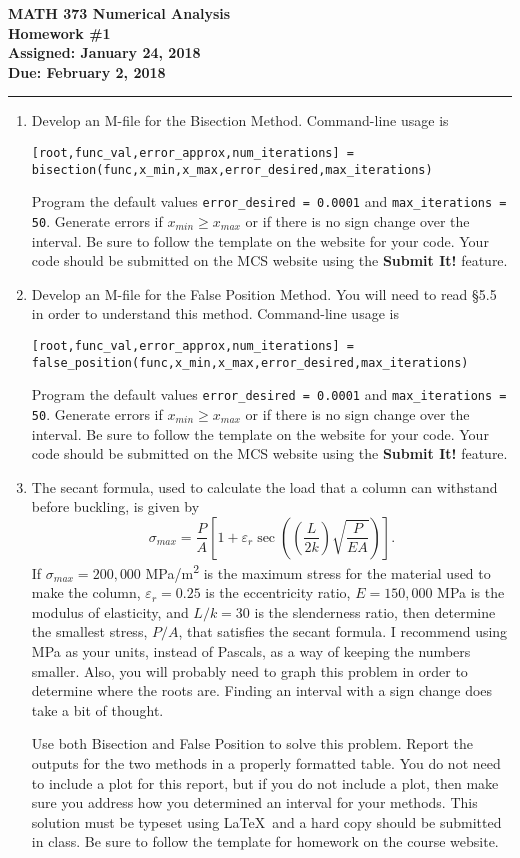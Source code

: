 \documentclass[11pt]{article}
\newcommand{\HWKtitle}[4]{\begin{center}
\textbf{#1\\Homework #2\\Assigned: #3\\Due: #4}
\end{center}\medskip\hrule\bigskip}
\begin{document}
\HWKtitle{MATH 373 Numerical Analysis}{\#1}{January 24, 2018}{February 2, 2018}

\begin{enumerate}

\item  Develop an M-file for the Bisection Method.  Command-line usage is

	\texttt{[root,func\_val,error\_approx,num\_iterations] = \\bisection(func,x\_min,x\_max,error\_desired,max\_iterations)}
	
	Program the default values \texttt{error\_desired = 0.0001} and \texttt{max\_iterations = 50}.  Generate errors if $x_{min} \geq x_{max}$ or if there is no sign change over the interval.  Be sure to follow the template on the website for your code.  Your code should be submitted on the MCS website using the \textbf{Submit It!} feature.

\item  Develop an M-file for the False Position Method.  You will need to read \S 5.5 in order to understand this method.  Command-line usage is

	\texttt{[root,func\_val,error\_approx,num\_iterations] = \\ false\_position(func,x\_min,x\_max,error\_desired,max\_iterations)}
	
	Program the default values \texttt{error\_desired = 0.0001} and \texttt{max\_iterations = 50}.  Generate errors if $x_{min} \geq x_{max}$ or if there is no sign change over the interval.  Be sure to follow the template on the website for your code.  Your code should be submitted on the MCS website using the \textbf{Submit It!} feature.
	
\item  The secant formula, used to calculate the load that a column can withstand before buckling, is given by $$\sigma_{max} = \frac{P}{A} \left[ 1 + \varepsilon_r \sec{\left( \left( \frac{L}{2k}\right) \sqrt{\frac{P}{EA}} \right)}\right].$$  If $\sigma_{max} = 200,000$ \si{MPa/m^2} is the maximum stress for the material used to make the column, $\varepsilon_r = 0.25$ is the eccentricity ratio, $E = 150,000$ \si{MPa} is the modulus of elasticity, and $L/k=30$ is the slenderness ratio, then determine the smallest stress, $P/A$, that satisfies the secant formula.  I recommend using \si{MPa} as your units, instead of Pascals, as a way of keeping the numbers smaller.  Also, you will probably need to graph this problem in order to determine where the roots are.  Finding an interval with a sign change does take a bit of thought.

Use both Bisection and False Position to solve this problem.  Report the outputs for the two methods in a properly formatted table.  You do not need to include a plot for this report, but if you do not include a plot, then make sure you address how you determined an interval for your methods.  This solution must be typeset using \LaTeX\ and a hard copy should be submitted in class.  Be sure to follow the template for homework on the course website.

\end{enumerate}



\end{document}
